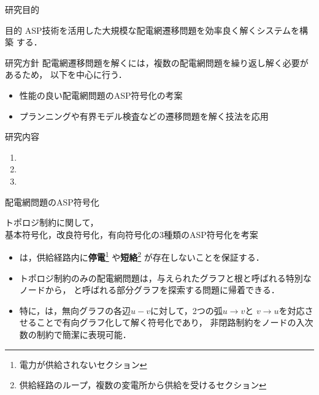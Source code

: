 \documentclass[dvipdfmx,11pt]{beamer}
\begin{document}
\begin{frame}{研究目的}
  \begin{alertblock}{目的}
   ASP技術を活用した大規模な配電網遷移問題を効率良く解くシステムを構築
   する．
  \end{alertblock}
  \vfill
\begin{exampleblock}{研究方針}
 配電網遷移問題を解くには，複数の配電網問題を繰り返し解く必要があるため，
 以下を中心に行う．
 \begin{itemize}
  \item 性能の良い配電網問題のASP符号化の考案
  \item プランニングや有界モデル検査などの遷移問題を解く技法を応用
 \end{itemize}

\end{exampleblock}
 \begin{block}{研究内容}
  \begin{enumerate}
   \item {}
   \item {}
   \item {}
  \end{enumerate}
 \end{block}
\end{frame}
\begin{frame}{配電網問題のASP符号化}
  \renewcommand{\thefootnote}{\fnsymbol{footnote}}
  \setcounter{footnote}{1}
\begin{block}{}
\centering
トポロジ制約に関して，\\
基本符号化，改良符号化，有向符号化の3種類のASP符号化を考案
\end{block}
 \vfill
 \begin{itemize}
  \item {}は，供給経路内に\textbf{停電}\footnote{%
        電力が供給されないセクション}%
        や\textbf{短絡}\footnote{供給経路のループ，複数の変電所から供給を受けるセクション}
        が存在しないことを保証する．
  \item トポロジ制約のみの配電網問題は，与えられたグラフと根と呼ばれる特別なノードから，
        と呼ばれる部分グラフを探索する問題に帰着できる．
  \item 特に，は，無向グラフの各辺$u-v$に対して，2つの弧$u\rightarrow v$と
        $v\rightarrow u$を対応させることで有向グラフ化して解く符号化であり，
        非閉路制約をノードの入次数の制約で簡潔に表現可能．
 \end{itemize}
\end{frame}
\end{document}

